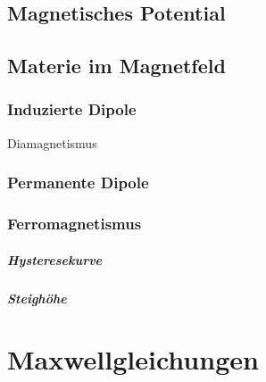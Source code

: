 \subsection{Magnetisches Potential}
\subsection{Materie im Magnetfeld}
\subsubsection{Induzierte Dipole} Diamagnetismus
\subsubsection{Permanente Dipole}
\subsubsection{Ferromagnetismus}
\subparagraph{Hysteresekurve}
\subparagraph{Steighöhe}

\section{Maxwellgleichungen}